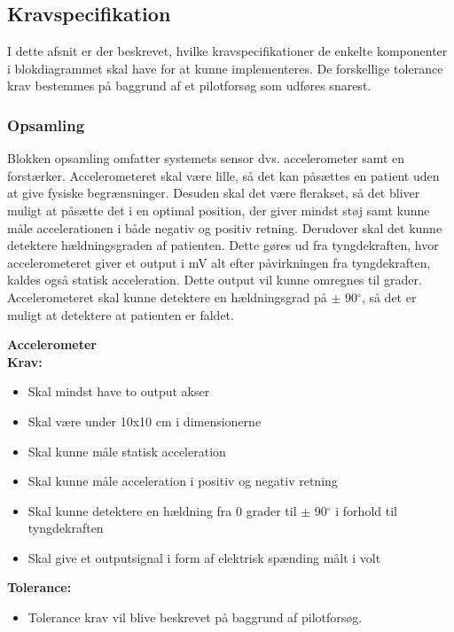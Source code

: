 \subsection{Kravspecifikation}
I dette afsnit er der beskrevet, hvilke kravspecifikationer de enkelte komponenter i blokdiagrammet skal have for at kunne implementeres. De forskellige tolerance krav bestemmes på baggrund af et pilotforsøg som udføres snarest.

\subsubsection{Opsamling}
Blokken opsamling omfatter systemets sensor dvs. accelerometer samt en forstærker. Accelerometeret skal være lille, så det kan påsættes en patient uden at give fysiske begrænsninger. Desuden skal det være flerakset, så det bliver muligt at påsætte det i en optimal position, der giver mindst støj samt kunne måle accelerationen i både negativ og positiv retning. Derudover skal det kunne detektere hældningsgraden af patienten. Dette gøres ud fra tyngdekraften, hvor accelerometeret giver et output i mV alt efter påvirkningen fra tyngdekraften, kaldes også statisk acceleration. Dette output vil kunne omregnes til grader. Accelerometeret skal kunne detektere en hældningsgrad på $\pm$ 90$^{\circ}$, så det er muligt at detektere at patienten er faldet.  


\textbf{Accelerometer}\\
\textbf{Krav:}
\begin{itemize}
\item Skal mindst have to output akser
\item Skal være under 10x10 cm i dimensionerne
\item Skal kunne måle statisk acceleration
\item Skal kunne måle acceleration i positiv og negativ retning
\item Skal kunne detektere en hældning fra 0 grader til $\pm$ 90$^{\circ}$ i forhold til tyngdekraften
\item Skal give et outputsignal  i form af elektrisk spænding målt i volt
\end{itemize}

\textbf{Tolerance:}\\
\begin{itemize}
\item Tolerance krav vil blive beskrevet på baggrund af pilotforsøg.
\end{itemize}

